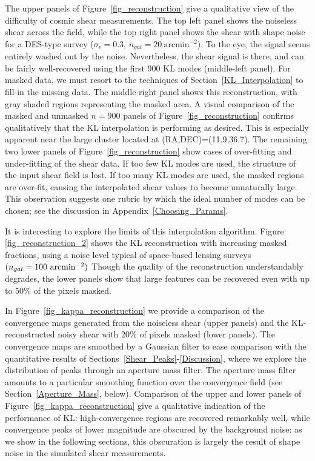 The upper panels of Figure~\ref{fig_reconstruction} give a qualitative view
of the difficulty of cosmic shear measurements.  The top left panel shows the
noiseless shear across the field, while the top right panel shows the
shear with shape noise for a DES-type survey ($\sigma_\epsilon=0.3$, 
$\bar{n}_{gal} = 20\ \mathrm{arcmin}^{-2}$).  To the eye, the signal seems
entirely washed out by the noise.  Nevertheless, the shear signal is there,
and can be fairly well-recovered using the first 900 KL modes 
(middle-left panel). For masked data, we must resort to the 
techniques of Section~\ref{KL_Interpolation} to fill-in the missing data.
The middle-right panel shows this reconstruction, with gray shaded
regions representing the masked area.  A visual comparison of the masked 
and unmasked $n=900$ panels of Figure~\ref{fig_reconstruction} confirms
qualitatively that the KL interpolation is performing as desired.  This is
especially apparent near the large cluster located at (RA,DEC)=(11.9,36.7).  
The remaining two lower panels of Figure~\ref{fig_reconstruction} 
show cases of over-fitting and under-fitting
of the shear data. If too few KL modes are used, the structure of the input 
shear field is lost.  If too many KL modes are used, the masked regions 
are over-fit,
causing the interpolated shear values to become unnaturally large.  This
observation suggests one rubric by which the ideal number of modes can be
chosen; see the discussion in Appendix~\ref{Choosing_Params}.

It is interesting to explore the limits of this interpolation algorithm.
Figure \ref{fig_reconstruction_2} shows the KL reconstruction with
increasing masked fractions, using a noise level typical of space-based
lensing surveys $(n_{gal}=100\ {\rm arcmin}^{-2})$  Though the quality of
the reconstruction understandably degrades, the lower panels show that
large features can be recovered even with up to 50\% of the pixels masked.

In Figure~\ref{fig_kappa_reconstruction} we provide a comparison of the
convergence maps generated from the noiseless shear (upper panels) and
the KL-reconstructed noisy shear with 20\% of pixels masked (lower panels).  
The convergence maps are smoothed by a Gaussian filter to 
ease comparison with the quantitative
results of Sections~\ref{Shear_Peaks}-\ref{Discussion}, where we explore
the distribution of peaks through an aperture mass filter.  The aperture
mass filter amounts to a particular smoothing function over the 
convergence field (see Section~\ref{Aperture_Mass}, below).
Comparison of the upper and lower panels of 
Figure~\ref{fig_kappa_reconstruction} give a qualitative indication of
the performance of KL: high-convergence regions are recovered remarkably
well, while convergence peaks of lower magnitude are obscured by the 
background noise: as we show in the following sections, 
this obscuration is largely the result of shape noise 
in the simulated shear measurements.

